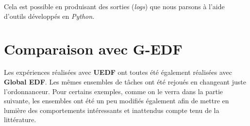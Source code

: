 	Cela est possible en produisant des sorties (\textit{logs}) que nous parsons à l'aide d'outils 
	développés en \textit{Python}. 
	

\section{Comparaison avec G-EDF}

	Les expériences réalisées avec \textbf{UEDF }ont toutes été également réalisées avec \textbf{Global EDF}.
	Les mêmes ensembles de tâches ont été rejoués en changeant juste l'ordonnanceur. Pour certains exemples, comme
	on le verra dans la partie suivante, les ensembles ont été un peu modifiés également afin de 
	mettre en lumière des comportements intéressants et inattendus compte tenu de la littérature.